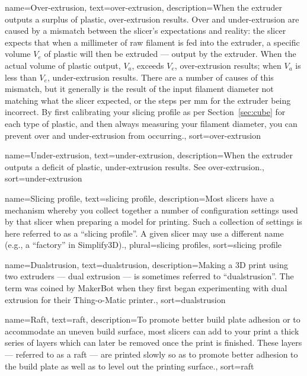 {
        name={Over-extrusion},
        text={over-extrusion},
        description={When the extruder outputs a surplus of plastic,
o\-ver-ex\-tru\-sion results.  Over and under-extrusion are caused by a mismatch
between the slicer's expectations and reality: the slicer expects that when
a millimeter of raw filament is fed into the extruder, a specific volume
$V_e$ of plastic will then be extruded --- output by the extruder.  When
the actual volume of plastic output, $V_a$, exceeds $V_e$, over-extrusion
results; when $V_a$ is less than $V_e$, under-extrusion results.  There are
a number of causes of this mismatch, but it generally is the result of the
input filament diameter not matching what the slicer expected, or the
steps per mm for the extruder being incorrect.  By first calibrating your
slicing profile as per Section~\ref{sec:cube} for each type of plastic, and
then always measuring your filament diameter, you can prevent over and
under-extrusion from occurring.},
       sort=over-extrusion
}

{
        name={Under-extrusion},
        text={under-extrusion},
        description={When the extruder outputs a deficit of plastic,
under-extrusion results. See \gls{over-extrusion}.},
       sort=under-extrusion
}

{
        name={Slicing profile},
        text={slicing profile},
        description={Most slicers have a mechanism whereby you collect
together a number of configuration settings used by that slicer when
preparing a model for printing.  Such a collection of settings is here
referred to as a ``slicing profile''.  A given slicer may use a different
name (e.g., a ``factory'' in Simplify3D).},
        plural={slicing profiles},
        sort=slicing profile
}

{
        name={Dualstrusion},
        text={dualstrusion},
        description={Making a 3D print using two extruders --- dual extrusion
--- is sometimes referred to ``dualstrusion''.  The term was coined by
MakerBot when they first began experimenting with dual extrusion for
their Thing-o-Matic printer.},
      sort=dualstrusion
}

{
        name={Raft},
        text={raft},
        description={To promote better build plate adhesion or to accommodate an uneven build surface, most slicers can add to your print a thick series of layers which can later be removed once the print is finished.  These layers --- referred to as a raft --- are printed slowly so as to promote better adhesion to the build plate as well as to level out the printing surface.},
        sort=raft
}

